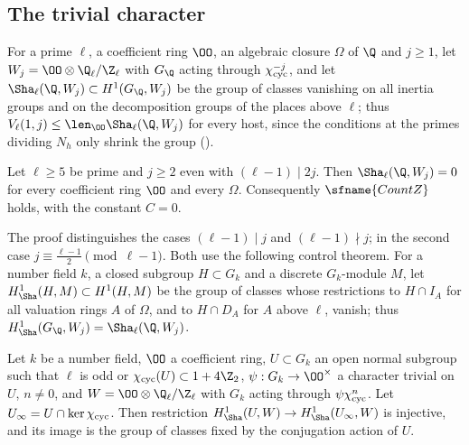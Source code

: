 \subsection{The trivial character}\label{sec:pf:vwin:Z}

For a prime $\ell$, a coefficient ring $\OO$, an algebraic closure $\Omega$ of $\Q$ and $j\ge1$, let $W_j=\OO\otimes\vwinQZ$ with
$G_\Q$ acting through $\chi_{\mathrm{cyc}}^{-j}$, and let $\Sha_\ell(\Q,W_j)\subset H^1(G_\Q,W_j)$ be the group of classes vanishing on all
inertia groups and on the decomposition groups of the places above $\ell$; thus $V_\ell(1,j)\le\len_\OO\Sha_\ell(\Q,W_j)$ for every
host, since the conditions at the primes dividing $N_h$ only shrink the group ().

\begin{proposition}\label{pf:vwin:propZ}
Let $\ell\ge5$ be prime and $j\ge2$ even with $(\ell-1)\mid2j$. Then $\Sha_\ell(\Q,W_j)=0$ for every coefficient ring $\OO$ and every
$\Omega$. Consequently $\sfname{CountZ}$ holds, with the constant $C=0$.
\end{proposition}

The proof distinguishes the cases $(\ell-1)\mid j$ and $(\ell-1)\nmid j$; in the second case $j\equiv\frac{\ell-1}2\pmod{\ell-1}$. Both use
the following control theorem. For a number field $k$, a closed subgroup $H\subset G_k$ and a discrete $G_k$-module $M$, let
$H^1_\Sha(H,M)\subset H^1(H,M)$ be the group of classes whose restrictions to $H\cap I_A$ for all valuation rings $A$ of $\Omega$, and to
$H\cap D_A$ for $A$ above $\ell$, vanish; thus $H^1_\Sha(G_\Q,W_j)=\Sha_\ell(\Q,W_j)$.

\begin{proposition}[Control]\label{pf:vwin:control}
Let $k$ be a number field, $\OO$ a coefficient ring, $U\subset G_k$ an open normal subgroup such that $\ell$ is odd or
$\vwincyc(U)\subset1+4\Z_2$, $\psi:G_k\to\OO^\times$ a character trivial on $U$, $n\ne0$, and $W=\OO\otimes\vwinQZ$ with $G_k$ acting through
$\psi\chi_{\mathrm{cyc}}^n$. Let $U_\infty=U\cap\ker\chi_{\mathrm{cyc}}$. Then restriction $H^1_\Sha(U,W)\to H^1_\Sha(U_\infty,W)$ is injective, and its image is the
group of classes fixed by the conjugation action of $U$.
\end{proposition}

